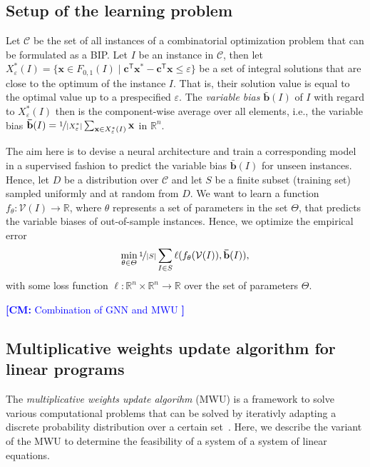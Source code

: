 \documentclass[11pt, DIV=12]{scrartcl}
\theoremstyle{definition}
\newcommand{\new}[1]{\emph{#1}}
\newcommand{\cC}{\ensuremath{{\mathcal C}}\xspace}
\newcommand{\cV}{\ensuremath{{\mathcal V}}\xspace}
\newcommand{\bbR}{\ensuremath{\mathbb{R}}}
\newcommand{\RR}{\mathbb{R}}
\newcommand{\trans}{^\mathsf{T}}
\renewcommand{\vec}[1]{\mathbf{#1}}
\newcommand{\cm}[1]{{{\textcolor{blue}{\textbf{[CM:} {#1}\textbf{]}}}}}
\begin{document}
\subsection{Setup of the learning problem}
Let $\cC$ be the set of all instances of a combinatorial optimization problem that can be formulated as a BIP. Let $I$ be an instance in $\cC$, then let $X^*_{\varepsilon}(I) = \{ \vec{x} \in F_{0,1}(I) \mid \vec{c}\trans\vec{x}^* - \vec{c}\trans\vec{x} \leq \varepsilon \}$ be a set of integral solutions that are \glqq close\grqq{}  to the optimum of the instance $I$. That is, their solution value is equal to the optimal value up to a prespecified $\varepsilon$. The \new{variable bias} $\vec{\bar{b}}(I)$ of $I$ with regard to $X^*_{\varepsilon}(I)$  then is the component-wise average over all elements, i.e., the variable bias $\vec{\bar{b}}(I) = \nicefrac{1}{|X^*_{\varepsilon}|}\sum_{\vec{x} \in X^*_{\varepsilon}(I)} \vec{x}$ in $\bbR^n$.

The aim here is to devise a neural architecture and train a corresponding model in  a supervised fashion to predict the variable bias $\vec{\bar{b}}(I)$ for unseen instances. Hence, let $D$ be a distribution over $\cC$ and let $S$ be a finite subset (training set) sampled uniformly and at random from $D$. We want to learn a function $f_{\theta} \colon \cV(I) \to \RR$, where $\theta$ represents a set of parameters in the set $\Theta$, that predicts the variable biases of out-of-sample instances. Hence, we optimize the empirical error
\begin{equation*}
\min_{\theta \in \Theta} \nicefrac{1}{|S|}\sum_{I \in S} \ell(f_{\theta}(\cV(I)),\vec{\bar{b}}(I)),
\end{equation*}
with some loss function $\ell \colon \bbR^n \times \bbR^n \to \bbR$ over the set of parameters $\Theta$.

\cm{Combination of GNN and MWU }


\subsection{Multiplicative weights update algorithm for linear programs}

The \new{multiplicative weights update algorihm} (MWU) is a framework to solve various computational problems that can be solved by iterativly adapting a discrete probability distribution over a certain set~\cite{Aro+2012}. Here, we describe the variant of the MWU to determine the feasibility of a system of a system of linear equations. 
\end{document}
